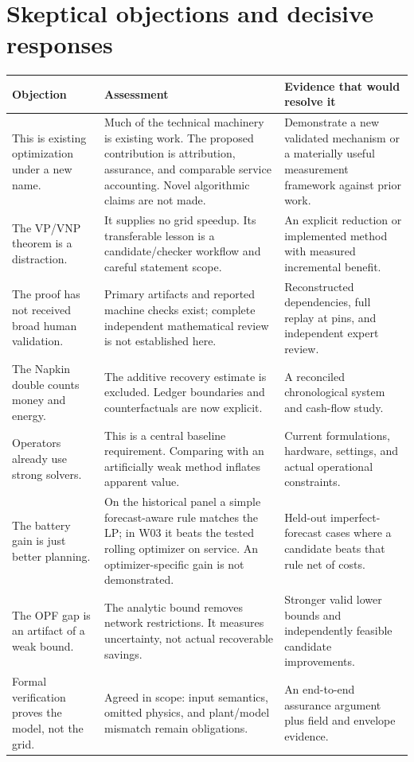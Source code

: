 \documentclass[11pt,letterpaper]{article}
\begin{document}
\section{Skeptical objections and decisive responses}
\label{sec:skeptics}
\begin{longtable}{P{.27\linewidth}P{.38\linewidth}P{.26\linewidth}}
\toprule Objection & Assessment & Evidence that would resolve it\\\midrule\endhead
This is existing optimization under a new name. & Much of the technical machinery is existing work. The proposed contribution is attribution, assurance, and comparable service accounting. Novel algorithmic claims are not made. & Demonstrate a new validated mechanism or a materially useful measurement framework against prior work.\\
The VP/VNP theorem is a distraction. & It supplies no grid speedup. Its transferable lesson is a candidate/checker workflow and careful statement scope. & An explicit reduction or implemented method with measured incremental benefit.\\
The proof has not received broad human validation. & Primary artifacts and reported machine checks exist; complete independent mathematical review is not established here. & Reconstructed dependencies, full replay at pins, and independent expert review.\\
The Napkin double counts money and energy. & The additive recovery estimate is excluded. Ledger boundaries and counterfactuals are now explicit. & A reconciled chronological system and cash-flow study.\\
Operators already use strong solvers. & This is a central baseline requirement. Comparing with an artificially weak method inflates apparent value. & Current formulations, hardware, settings, and actual operational constraints.\\
The battery gain is just better planning. & On the historical panel a simple forecast-aware rule matches the LP; in W03 it beats the tested rolling optimizer on service. An optimizer-specific gain is not demonstrated. & Held-out imperfect-forecast cases where a candidate beats that rule net of costs.\\
The OPF gap is an artifact of a weak bound. & The analytic bound removes network restrictions. It measures uncertainty, not actual recoverable savings. & Stronger valid lower bounds and independently feasible candidate improvements.\\
Formal verification proves the model, not the grid. & Agreed in scope: input semantics, omitted physics, and plant/model mismatch remain obligations. & An end-to-end assurance argument plus field and envelope evidence.\\

\end{longtable}
\end{document}

